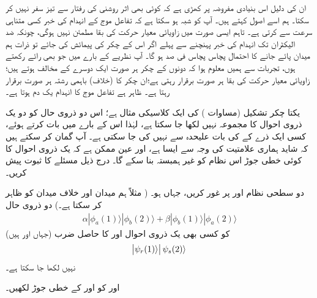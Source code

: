 ان کی دلیل اس بنیادی مفروضہ پر کھڑی ہے کہ کوئی بھی اثر روشنی کی رفتار سے تیز سفر نہیں کر سکتا۔ ہم اسے اصول  کہتے ہیں۔ آپ کو شبہ ہو سکتا ہے کہ تفاعل موج کے انہدام کی خبر کسی متناہی سرعت سے  کرتی ہے۔ تاہم ایسی صورت میں زاویائی معیار حرکت کی بقا مطمئن نہیں ہوگی، چونکہ ضد الیکٹران تک انہدام کی خبر پہنچنے سے پہلے اگر اس کے چکر کی پیمائش کی جائے تو  ذرات ہم میدان پائے جانے کا احتمال پچاس پچاس فی صد ہو گا۔ آپ نظریے کے بارے میں جو بھی رائے رکھتے ہوں، تجربات سے ہمیں معلوم ہوا کہ دونوں کے چکر ہر صورت ایک دوسرے کے مخالف ہوتے ہیں؛ زاویائی معیار حرکت کی بقا ہر صورت برقرار رہتی ہے؛ان چکر کا (خلاف) باہمی رشتہ ہر صورت برقرار رہتا ہے۔ ظاہر ہے تفاعل موج کا انہدام یک دم ہوتا ہے۔

 یکتا چکر تشکیل (مساوات )  کی ایک کلاسیکی مثال ہے؛ اس دو ذروی حال کو دو یک ذروی احوال کا مجموعہ نہیں لکھا جا سکتا ہے، لہٰذا اس کے بارے میں بات کرتے ہوئے، کسی ایک ذرے کے  کی بات علیحدہ سے نہیں کی جا سکتی ہے۔ آپ گمان کر سکتے ہیں کہ شاید ہماری علامتیت کی وجہ سے ایسا ہے، اور عین ممکن ہے کہ یک ذروی احوال کا کوئی خطی جوڑ اس نظام کو غیر ہمبستہ بنا سکے گا۔ درج ذیل مسئلے کا ثبوت پیش کریں۔

دو سطحی نظام  اور  پر غور کریں، جہاں  ہو۔
( مثلاً  ہم میدان اور  خلاف میدان کو ظاہر کر سکتا ہے۔) دو ذروی حال 
\begin{align*}
	\alpha|\phi_a(1)\rangle|\phi_b(2)\rangle+\beta|\phi_b(1)\rangle|\phi_a(2)\rangle
\end{align*}
(جہاں  اور  ہیں) کو کسی بھی یک ذروی احوال  اور  کا حاصل ضرب
\begin{align*}
	\abs{\psi_r(1)\rangle}\psi_s(2)\rangle
\end{align*}
نہیں لکھا جا سکتا ہے۔

  اور  کو  اور  کے خطی جوڑ لکھیں۔


